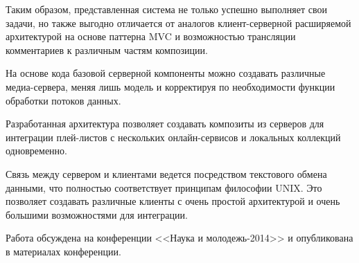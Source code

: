 
Таким образом, представленная система не только успешно выполняет свои
задачи, но также выгодно отличается от аналогов клиент-серверной
расширяемой архитектурой на основе паттерна MVC и возможностью
трансляции комментариев к различным частям композиции.

На основе кода базовой серверной компоненты можно создавать различные медиа-сервера, меняя лишь
модель и корректируя по необходимости функции обработки потоков
данных.

Разработанная архитектура позволяет создавать композиты из серверов для интеграции
плей-листов с нескольких онлайн-сервисов и локальных коллекций одновременно.

Связь между сервером и клиентами ведется посредством
текстового обмена данными, что полностью соответствует принципам
философии UNIX. Это позволяет создавать различные клиенты с очень
простой архитектурой и очень большими возможностями для интеграции.

Работа обсуждена на конференции <<Наука и молодежь-2014>> и опубликована
в материалах конференции.\cite{secna:nim}


